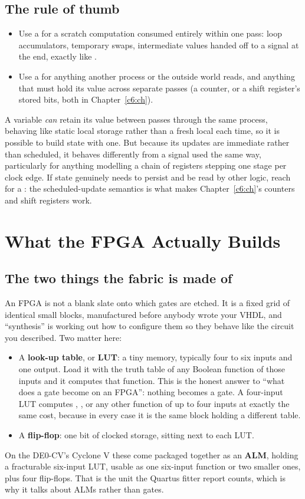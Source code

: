 \subsection{The rule of thumb}
\label{c5:rule}
\begin{itemize}
  \item Use a  for a scratch computation consumed entirely within one pass: loop
    accumulators, temporary swaps, intermediate values handed off to a signal at the end, exactly
    like .
  \item Use a  for anything another process or the outside world reads, and anything
    that must hold its value across separate passes (a counter, or a shift register's stored bits,
    both in Chapter~\ref{c6:ch}).
\end{itemize}
A variable \emph{can} retain its value between passes through the same process, behaving like
static local storage rather than a fresh local each time, so it is possible to build state with
one. But because its updates are immediate rather than scheduled, it behaves differently from a
signal used the same way, particularly for anything modelling a chain of registers stepping one
stage per clock edge. If state genuinely needs to persist and be read by other logic, reach for a
: the scheduled-update semantics is what makes Chapter~\ref{c6:ch}'s counters and
shift registers work.

\section{What the FPGA Actually Builds}
\label{c5:a3}

\subsection{The two things the fabric is made of}
\label{c5:fabric}
An FPGA is not a blank slate onto which gates are etched. It is a fixed grid of identical small
blocks, manufactured before anybody wrote your VHDL, and ``synthesis'' is working out how to
configure them so they behave like the circuit you described. Two matter here:
\begin{itemize}
  \item A \textbf{look-up table}, or \textbf{LUT}: a tiny memory, typically four to six inputs and
    one output. Load it with the truth table of any Boolean function of those inputs and it computes
    that function. This is the honest answer to ``what does a gate become on an FPGA'': nothing
    becomes a gate. A four-input LUT computes , , or
    any other function of up to four inputs at exactly the same cost, because in every case it is
    the same block holding a different table.
  \item A \textbf{flip-flop}: one bit of clocked storage, sitting next to each LUT.
\end{itemize}
On the DE0-CV's Cyclone V these come packaged together as an \textbf{ALM}, holding a fracturable
six-input LUT, usable as one six-input function or two smaller ones, plus four flip-flops. That is
the unit the Quartus fitter report counts, which is why it talks about ALMs rather than gates.

